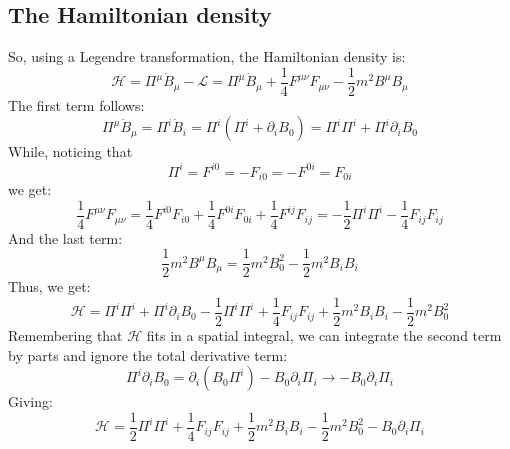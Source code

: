 \documentclass{article}
\begin{document}
\subsection{The Hamiltonian density}
So, using a Legendre transformation, the Hamiltonian density is:
\begin{equation}
    \mathcal{H} = \Pi^\mu \dot{B}_\mu - \mathcal{L} =
    \Pi^\mu \dot{B}_\mu + \frac{1}{4}F^{\mu\nu}F_{\mu\nu} - \frac{1}{2}m^2B^{\mu}B_{\mu}
\end{equation}
The first term follows:
\begin{equation}
    \Pi^\mu \dot{B}_\mu = \Pi^i \dot{B} _i = \Pi^i \left(\Pi^i + \partial_i B_0\right) = 
    \Pi^i \Pi^i + \Pi^i \partial_i B_0
\end{equation}
While, noticing that
\begin{equation}
    \Pi^i = F^{i0} = -F_{i0} = -F^{0i} = F_{0i}
\end{equation} 
we get:
\begin{equation}
    \frac{1}{4}F^{\mu\nu}F_{\mu\nu} = \frac{1}{4}F^{i0}F_{i0} + \frac{1}{4}F^{0i}F_{0i} + \frac{1}{4}F^{ij}F_{ij} = -\frac{1}{2}\Pi^i\Pi^i - \frac{1}{4}F_{ij}F_{ij}
\end{equation}
And the last term:
\begin{equation}
    \frac{1}{2}m^2 B^\mu B_\mu = \frac{1}{2}m^2 B_0^2 - \frac{1}{2}m^2 B_i B_i
\end{equation}
Thus, we get:
\begin{equation}
    \mathcal{H} = \Pi^i \Pi^i + \Pi^i\partial_iB_0 - \frac{1}{2}\Pi^i\Pi^i + \frac{1}{4}F_{ij}F_{ij} + \frac{1}{2}m^2 B_i B_i - \frac{1}{2}m^2 B_0^2
\end{equation}
Remembering that $\mathcal{H}$ fits in a spatial integral, we can integrate the second term by parts and ignore the total derivative term:
\begin{equation}
    \Pi^i\partial_iB_0 = \partial_i \left(B_0\Pi^i\right) - B_0 \partial_i \Pi_i \rightarrow - B_0 \partial_i \Pi_i
\end{equation}
Giving:
\begin{equation}
    \mathcal{H} = \frac{1}{2}\Pi^i \Pi^i + \frac{1}{4}F_{ij}F_{ij} + \frac{1}{2}m^2 B_i B_i - \frac{1}{2}m^2 B_0^2 - B_0 \partial_i \Pi_i
\end{equation}
\end{document}
